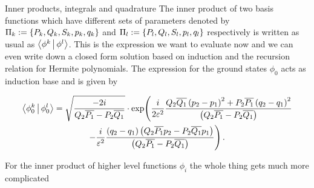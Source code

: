 \begin{chapter}{Inner products, integrals and quadrature}
The inner product of two basis functions which have different sets of
parameters denoted by $\Pi_k := \{P_k, Q_k, S_k, p_k, q_k\}$ and
$\Pi_l := \{P_l, Q_l, S_l, p_l, q_l\}$ respectively is written as usual as
$\Braket{ \phi^k | \phi^l }$. This is the expression we want to evaluate now and
we can even write down a closed form solution based on induction and the recursion
relation for Hermite polynomials. The expression for the ground states $\phi_0$
acts as induction base and is given by


\begin{multline} \label{eq:multifamily_innerp_ground}
  \Braket{ \phi_0^k | \phi_0^l } =
  \sqrt{\frac{-2 i}{Q_2 \overline{P_1} - P_2 \overline{Q_1}}} \cdot
    \exp \Biggl(
      \frac{i}{2 \varepsilon^2}
      \frac{Q_2 \overline{Q_1} \left(p_2-p_1\right)^2 + P_2 \overline{P_1} \left(q_2-q_1\right)^2}
            {\left(Q_2 \overline{P_1} - P_2 \overline{Q_1}\right)}
    \\
    -\frac{i}{\varepsilon^2}
    \frac{\left(q_2-q_1\right) \left( Q_2 \overline{P_1} p_2 - P_2 \overline{Q_1} p_1\right)}
         {\left(Q_2 \overline{P_1} - P_2 \overline{Q_1}\right)}
    \Biggr) \,.
\end{multline}

For the inner product of higher level functions $\phi_i$ the whole thing gets much
more complicated



\end{chapter}

